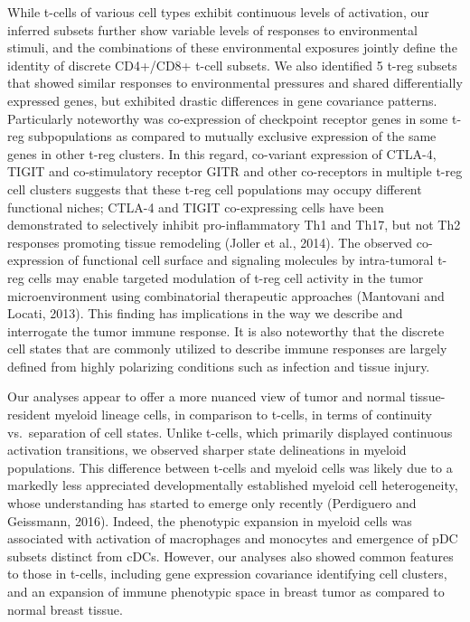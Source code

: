 While t-cells of various cell types exhibit continuous levels of activation, our inferred subsets further show variable levels of responses to environmental stimuli, and the combinations of these environmental exposures jointly define the identity of discrete CD4+/CD8+ t-cell subsets. 
We also identified 5 t-reg subsets that showed similar responses to environmental pressures and shared differentially expressed genes, but exhibited drastic differences in gene covariance patterns. 
Particularly noteworthy was co-expression of checkpoint receptor genes in some t-reg subpopulations as compared to mutually exclusive expression of the same genes in other t-reg clusters. 
In this regard, co-variant expression of CTLA-4, TIGIT and co-stimulatory receptor GITR and other co-receptors in multiple t-reg cell clusters suggests that these t-reg cell populations may occupy different functional niches; CTLA-4 and TIGIT co-expressing cells have been demonstrated to selectively inhibit pro-inflammatory Th1 and Th17, but not Th2 responses promoting tissue remodeling (Joller et al., 2014). %
The observed co-expression of functional cell surface and signaling molecules by intra-tumoral t-reg cells may enable targeted modulation of t-reg cell activity in the tumor microenvironment using combinatorial therapeutic approaches (Mantovani and Locati, 2013).  %
This finding has implications in the way we describe and interrogate the tumor immune response. 
It is also noteworthy that the discrete cell states that are commonly utilized to describe immune responses are largely defined from highly polarizing conditions such as infection and tissue injury.

Our analyses appear to offer a more nuanced view of tumor and normal tissue-resident myeloid lineage cells, in comparison to t-cells, in terms of continuity vs.\ separation of cell states. 
Unlike t-cells, which primarily displayed continuous activation transitions, we observed sharper state delineations in myeloid populations. 
This difference between t-cells and myeloid cells was likely due to a markedly less appreciated developmentally established myeloid cell heterogeneity, whose understanding has started to emerge only recently (Perdiguero and Geissmann, 2016). %
Indeed, the phenotypic expansion in myeloid cells was associated with activation of macrophages and monocytes and emergence of pDC subsets distinct from cDCs. 
However, our analyses also showed common features to those in t-cells, including gene expression covariance identifying cell clusters, and an expansion of immune phenotypic space in breast tumor as compared to normal breast tissue.

